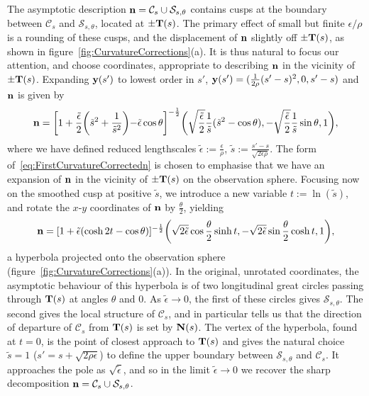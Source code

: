     The asymptotic description ${\bf n} = \mathcal{C}_s \cup \mathcal{S}_{s,\theta}$ contains cusps at the boundary between $\mathcal{C}_s$ and $\mathcal{S}_{s,\theta}$, located at $\pm {\bf T}(s)$. The primary effect of small but finite $\epsilon/\rho$ is a rounding of these cusps, and the displacement of ${\bf n}$ slightly off $\pm {\bf T}(s)$, as shown in figure~\ref{fig:CurvatureCorrections}(a). It is thus natural to focus our attention, and choose coordinates, appropriate to describing $\bf n$ in the vicinity of $\pm {\bf T}(s)$. Expanding ${\bf y}(s')$ to lowest order in $s'$, ${\bf y}(s') = (\frac{1}{2\rho}(s'-s)^2,0,s'-s)$ and $\bf n$ is given by
    \begin{equation}
        {\bf n} = \biggl[1 + \frac{\tilde{\epsilon}}{2} \biggr(\tilde{s}^2 +\frac{1}{\tilde{s}^2}\biggl)- \tilde{\epsilon}\cos \theta \biggr]^{-\frac{1}{2}} 
        \biggr(
        \sqrt{\frac{\tilde{\epsilon}}{2}}\frac{1}{\tilde{s}} (\tilde{s}^2 - \cos \theta),
        -\sqrt{\frac{\tilde{\epsilon}}{2}}\frac{1}{\tilde{s}} \sin \theta,
        1
        \biggl),
        \label{eq:FirstCurvatureCorrectedn}
    \end{equation}
    where we have defined reduced lengthscales $\tilde{\epsilon}:=\frac{\epsilon}{\rho}$, $\tilde{s} :=\frac{s'-s}{\sqrt{2\epsilon \rho}}$. The form of~\eqref{eq:FirstCurvatureCorrectedn} is chosen to emphasise that we have an expansion of $\bf n$ in the vicinity of $\pm{\bf T}(s)$ on the observation sphere. Focusing now on the smoothed cusp at positive $\tilde{s}$, we introduce a new variable $t :=\ln(\tilde{s})$, and rotate the $x$-$y$ coordinates of ${\bf n}$ by $\frac{\theta}{2}$, yielding 
    \begin{equation}
        {\bf n}
        = [1 + \tilde{\epsilon}(\cosh 2t - \cos \theta )]^{-\frac{1}{2}}
        \biggr(
        \sqrt{2\tilde{\epsilon}} \cos \frac{\theta}{2} \sinh t, 
        -\sqrt{2\tilde{\epsilon}}\sin \frac{\theta}{2} \cosh t,
        1
        \biggl),
        \label{eq:CurvatureCorrectedn}
    \end{equation}
    a hyperbola projected onto the observation sphere (figure~\ref{fig:CurvatureCorrections}(a)). In the original, unrotated coordinates, the asymptotic behaviour of this hyperbola is of two longitudinal great circles passing through ${\bf T}(s)$ at angles $\theta$ and $0$. As $\tilde{\epsilon}\rightarrow 0$, the first of these circles gives $\mathcal{S}_{s,\theta}$. The second gives the local structure of $\mathcal{C}_s $, and in particular tells us that the direction of departure of $\mathcal{C}_s$ from ${\bf T}(s)$ is set by ${\bf N}(s)$. The vertex of the hyperbola, found at $t = 0$, is the point of closest approach to ${\bf T}(s)$ and gives the natural choice $\tilde{s} =1$ ($s' = s + \sqrt{2\rho \epsilon}$) to define the upper boundary between $\mathcal{S}_{s,\theta}$ and $\mathcal{C}_s $. It approaches the pole as $\sqrt{{\tilde{\epsilon}}}$, and so in the limit $\tilde{\epsilon} \rightarrow 0$ we recover the sharp decomposition ${\bf n} = \mathcal{C}_s \cup \mathcal{S}_{s,\theta}$.

